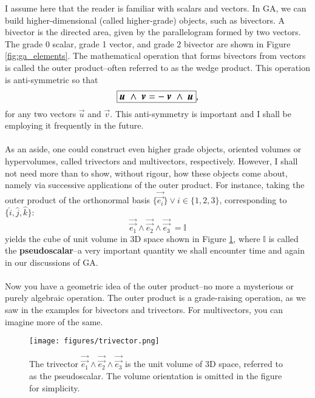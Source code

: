 I assume here that the reader is familiar with scalars and vectors. In GA, we can build higher-dimensional (called higher-grade) objects, such as bivectors. A bivector is the directed area, given by the parallelogram formed by two vectors. The grade 0 scalar, grade 1 vector, and grade 2 bivector are shown in Figure \ref{fig:ga_elements}. The mathematical operation that forms bivectors from vectors is called the outer product--often referred to as the wedge product. This operation is anti-symmetric so that 
\begin{equation} \label{eq:outer_product}
    \large\boxed{\vec{u} \ \wedge \ \vec{v} = - \ \vec{v} \ \wedge \ \vec{u} },
\end{equation}
for any two vectors $\vec{u}$ and $\vec{v}$. This anti-symmetry is important and I shall be employing it frequently in the future.
\\ \\
As an aside, one could construct even higher grade objects, oriented volumes or hypervolumes, called trivectors and multivectors, respectively. However, I shall not need more than to show, without rigour, how these objects come about, namely via successive applications of the outer product. For instance, taking the outer product of the  orthonormal basis $\{ \vec{\vec{e_i}} \} \vee i \in \{ 1, 2,3\} $, corresponding to $ \{ \hat{i}, \hat{j}, \hat{k} \}$:
\begin{equation} \label{eq:pseudoscalar_wedge_definition}
   \vec{\vec{e_1}} \wedge \vec{\vec{e_2}} \wedge \vec{\vec{e_3}} \ = \mathbb{I}  
\end{equation}
yields the cube of unit volume in 3D space shown in Figure \ref{fig:trivector}, where $\mathbb{I}$ is called the \textbf{pseudoscalar}--a very important quantity we shall encounter time and again in our discussions of GA.
\\ \\
Now you have a geometric idea of the outer product--no more a mysterious or purely algebraic operation. The outer product is a grade-raising operation, as we saw in the examples for bivectors and trivectors. For multivectors, you can imagine more of the same.
\begin{figure}[H]
   \centering
   \texttt{[image: figures/trivector.png]}
   \caption{The trivector $\vec{\vec{e_1}} \wedge \vec{\vec{e_2}} \wedge \vec{\vec{e_3}}$ is the unit volume of 3D space, referred to as the pseudoscalar. The volume orientation is omitted in the figure for simplicity.}
   \label{fig:trivector}
\end{figure}
   


